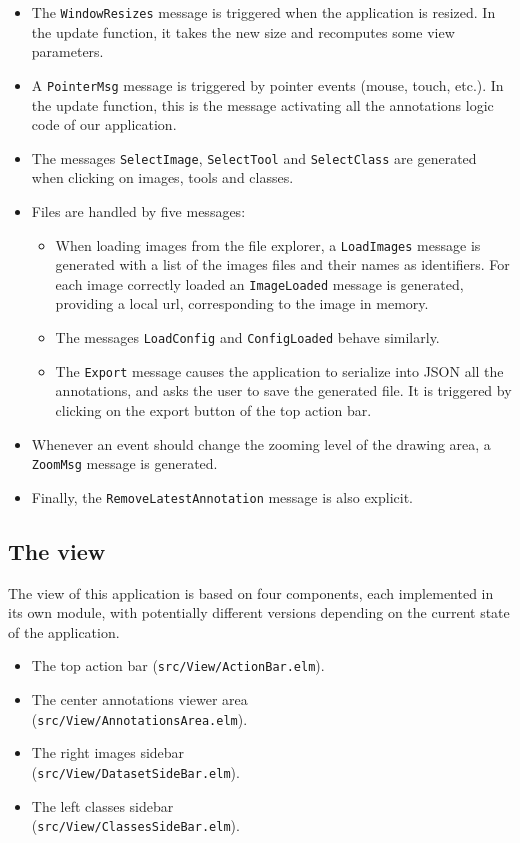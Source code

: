 \begin{itemize}
\item The \verb|WindowResizes| message is triggered when the application is resized.
	In the update function, it takes the new size and recomputes some view parameters.
\item A \verb|PointerMsg| message is triggered by pointer events (mouse, touch, etc.).
	In the update function, this is the message activating
	all the annotations logic code of our application.
\item The messages \verb|SelectImage|, \verb|SelectTool| and \verb|SelectClass|
	are generated when clicking on images, tools and classes.
\item Files are handled by five messages:
	\begin{itemize}
	\item When loading images from the file explorer,
		a \verb|LoadImages| message is generated with a list of the images files
		and their names as identifiers.
		For each image correctly loaded an \verb|ImageLoaded| message is generated,
		providing a local url, corresponding to the image in memory.
    \item The messages \verb|LoadConfig| and \verb|ConfigLoaded| behave similarly.
    \item The \verb|Export| message causes the application to serialize into JSON
		all the annotations, and asks the user to save the generated file.
		It is triggered by clicking on the export button of the top action bar.
	\end{itemize}
\item Whenever an event should change the zooming level of the drawing area,
	a \verb|ZoomMsg| message is  generated.
\item Finally, the \verb|RemoveLatestAnnotation| message is also explicit.
\end{itemize}


\subsection{The view}

The view of this application is based on four components,
each implemented in its own module, with potentially different versions
depending on the current state of the application.
\begin{itemize}
\item The top action bar (\verb|src/View/ActionBar.elm|).
\item The center annotations viewer area\\(\verb|src/View/AnnotationsArea.elm|).
\item The right images sidebar\\(\verb|src/View/DatasetSideBar.elm|).
\item The left classes sidebar\\(\verb|src/View/ClassesSideBar.elm|).
\end{itemize}


